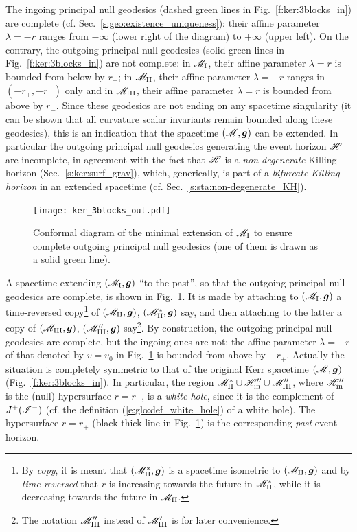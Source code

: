 The ingoing principal null geodesics (dashed green lines in
Fig.~\ref{f:ker:3blocks_in}) are complete (cf. Sec.~\ref{s:geo:existence_uniqueness}):
their affine parameter $\lambda=-r$
ranges from $-\infty$ (lower right of the diagram) to $+\infty$ (upper left). On the contrary, the outgoing principal null geodesics (solid green lines in
Fig.~\ref{f:ker:3blocks_in}) are not complete: in $\mathscr{M}_{\rm I}$, their affine parameter
$\lambda=r$ is bounded from below by $r_+$; in $\mathscr{M}_{\rm II}$, their affine parameter
$\lambda=-r$ ranges in $(-r_+,-r_-)$ only and in $\mathscr{M}_{\rm III}$, their affine parameter
$\lambda=r$ is bounded from above by $r_-$.
Since these geodesics are not ending on any spacetime singularity
(it can be shown that all curvature scalar invariants remain bounded along
these geodesics), this is an indication that the spacetime $(\mathscr{M},\bm{g})$
can be extended. In particular the outgoing principal null geodesics
generating the event horizon $\mathscr{H}$ are incomplete, in agreement with the fact
that $\mathscr{H}$ is a \emph{non-degenerate} Killing horizon (Sec.~\ref{s:ker:surf_grav}),
which, generically, is part of a \emph{bifurcate Killing horizon}
in an extended spacetime (cf. Sec.~\ref{s:sta:non-degenerate_KH}).


\begin{figure}
\centerline{\texttt{[image: ker\_3blocks\_out.pdf]}}
\caption[]{\label{f:ker:3blocks_out} \footnotesize
Conformal diagram of the minimal extension of $\mathscr{M}_{\rm I}$ to ensure
complete outgoing principal null geodesics (one of them is drawn as a solid green line).}
\end{figure}

A spacetime extending $(\mathscr{M}_{\rm I},\bm{g})$ ``to the past'', so that
the outgoing principal null geodesics are complete, is shown in
Fig.~\ref{f:ker:3blocks_out}. It is made by attaching to $(\mathscr{M}_{\rm I},\bm{g})$
a time-reversed copy\footnote{By \emph{copy}, it is meant
that $(\mathscr{M}_{\rm II}^*,\bm{g})$ is a spacetime isometric to $(\mathscr{M}_{\rm II},\bm{g})$
and by \emph{time-reversed} that $r$ is increasing towards
the future in $\mathscr{M}_{\rm II}^*$, while it is decreasing towards the future
in $\mathscr{M}_{\rm II}$.}
 of $(\mathscr{M}_{\rm II},\bm{g})$, $(\mathscr{M}_{\rm II}^*,\bm{g})$ say,
and then attaching to the latter a copy of $(\mathscr{M}_{\rm III},\bm{g})$, $(\mathscr{M}''_{\rm III},\bm{g})$ say\footnote{The notation
$\mathscr{M}''_{\rm III}$ instead of $\mathscr{M}'_{\rm III}$ is for later convenience.}.
By construction, the outgoing principal null geodesics are complete, but
the ingoing ones are not: the affine parameter $\lambda=-r$ of that
denoted by $v=v_0$ in Fig.~\ref{f:ker:3blocks_out} is bounded from above by $-r_+$. Actually the
situation is completely symmetric to that of the original Kerr
spacetime $(\mathscr{M},\bm{g})$ (Fig.~\ref{f:ker:3blocks_in}). In particular,
the region $\mathscr{M}_{\rm II}^*\cup\mathscr{H}''_{\rm in}\cup \mathscr{M}''_{\rm III}$, where
$\mathscr{H}''_{\rm in}$ is the (null) hypersurface $r=r_-$, is a
\emph{white hole},
since it is the complement of $J^+(\mathscr{I}^-)$ (cf. the definition (\ref{e:glo:def_white_hole})
of a white hole). The hypersurface $r=r_+$ (black thick line in  Fig.~\ref{f:ker:3blocks_out}) is the corresponding
\emph{past} event horizon.

